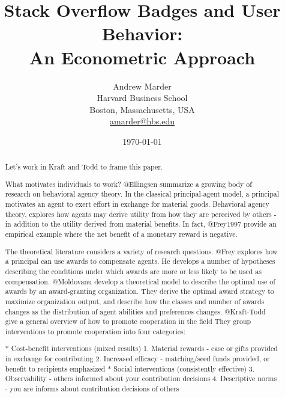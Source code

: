 \documentclass[conference]{IEEEtran}
\title{
  Stack Overflow Badges and User Behavior: \\
  An Econometric Approach
}
\author{
  Andrew Marder \\
  Harvard Business School \\
  Boston, Massachusetts, USA \\
  \href{mailto:amarder@hbs.edu}{amarder@hbs.edu}
}
\date{\today}
\newcommand{\1}{\mathds{1}}
\begin{document}
\maketitle

\begin{abstract}
Let's work in Kraft and Todd to frame this paper.

What motivates individuals to work? @Ellingsen summarize a growing body of research on behavioral agency theory. In the classical principal-agent model, a principal motivates an agent to exert effort in exchange for material goods. Behavioral agency theory, explores how agents may derive utility from how they are perceived by others - in addition to the utility derived from material benefits. In fact, @Frey1997 provide an empirical example where the net benefit of a monetary reward is negative.

The theoretical literature considers a variety of research questions. @Frey explores how a principal can use awards to compensate agents. He develops a number of hypotheses describing the conditions under which awards are more or less likely to be used as compensation. @Moldovanu develop a theoretical model to describe the optimal use of awards by an award-granting organization. They derive the optimal award strategy to maximize organization output, and describe how the classes and number of awards changes as the distribution of agent abilities and preferences changes. @Kraft-Todd give a general overview of how to promote cooperation in the field They group interventions to promote cooperation into four categories:

*   Cost-benefit interventions (mixed results)
    1. Material rewards - case or gifts provided in exchange for contributing
    2. Increased efficacy - matching/seed funds provided, or benefit to recipients emphasized
*   Social interventions (consistently effective)
    3. Observability - others informed about your contribution decisions
    4. Descriptive norms - you are informs about contribution decisions of others


\end{abstract}
\end{document}
